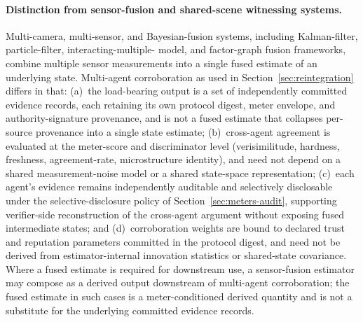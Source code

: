 \documentclass[a4paper,12pt]{article}
\begin{document}
\paragraph{Distinction from sensor-fusion and shared-scene
witnessing systems.}
Multi-camera, multi-sensor, and Bayesian-fusion systems,
including Kalman-filter, particle-filter, interacting-multiple-
model, and factor-graph fusion frameworks, combine multiple
sensor measurements into a single fused estimate of an
underlying state. Multi-agent corroboration as used in
Section~\ref{sec:reintegration} differs in that: (a)~the
load-bearing output is a set of independently committed evidence
records, each retaining its own protocol digest, meter envelope,
and authority-signature provenance, and is not a fused estimate
that collapses per-source provenance into a single state
estimate; (b)~cross-agent agreement is evaluated at the
meter-score and discriminator level (verisimilitude, hardness,
freshness, agreement-rate, microstructure identity), and need
not depend on a shared measurement-noise model or a shared
state-space representation; (c)~each agent's evidence remains
independently auditable and selectively disclosable under the
selective-disclosure policy of Section~\ref{sec:meters-audit},
supporting verifier-side reconstruction of the cross-agent
argument without exposing fused intermediate states; and
(d)~corroboration weights are bound to declared trust and
reputation parameters committed in the protocol digest, and
need not be derived from estimator-internal innovation
statistics or shared-state covariance. Where a fused estimate
is required for downstream use, a sensor-fusion estimator may
compose as a derived output downstream of multi-agent
corroboration; the fused estimate in such cases is a
meter-conditioned derived quantity and is not a substitute for
the underlying committed evidence records.
\end{document}
